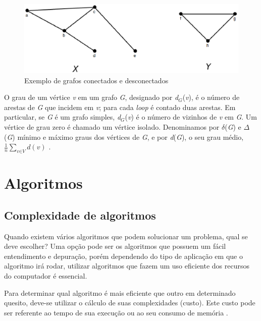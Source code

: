 \begin{apendicesenv}
\begin{figure}[!h]
	\centering
	\includegraphics[scale=0.45]{figuras/capitulo2/desconectados.eps}
	\caption[Exemplo de grafos conectados e desconectados]{Exemplo de grafos conectados e desconectados \cite{Bondy:2007}}
	\label{desconectados}
\end{figure}

O grau de um vértice \textit{v} em um grafo \textit{G}, designado por \textit{d$_G$}(\textit{v}), é o número de arestas de \textit{G} que incidem em \textit{v}; para cada \textit{loop} é contado duas arestas. Em particular, se \textit{G} é um grafo simples, \textit{d$_G$}(\textit{v}) é o número de vizinhos de \textit{v} em \textit{G}. Um vértice de grau zero é chamado um vértice isolado. Denominamos por $\delta$(\textit{G}) e $\Delta$(\textit{G}) mínimo e máximo graus dos vértices de \textit{G}, e por \textit{d}(\textit{G}), o seu grau médio, $\frac{1}{n}\sum_{\textit{v}\in\textit{V}} \textit{d}(\textit{v})$ \cite{Diestel:1997}.

\chapter{Algoritmos}

\section{Complexidade de algoritmos}
\label{sec:complexidade_algoritmos}

Quando existem vários algoritmos que podem solucionar um problema, qual se deve escolher? Uma opção pode ser os algoritmos que possuem um fácil entendimento e depuração, porém dependendo do tipo de aplicação em que o algoritmo irá rodar, utilizar algoritmos que fazem um uso eficiente dos recursos do computador é essencial.

Para determinar qual algoritmo é mais eficiente que outro em determinado quesito, deve-se utilizar o cálculo de suas complexidades (custo). Este custo pode ser referente ao tempo de sua execução ou ao seu consumo de memória \cite{Albuquerque:2004}.


\end{apendicesenv}
